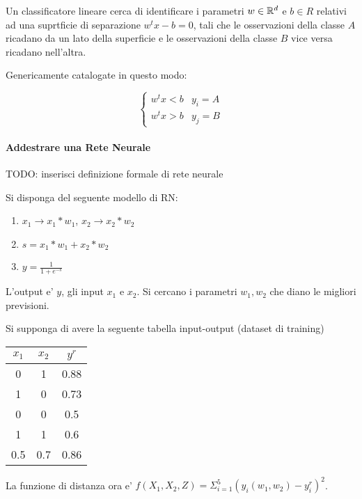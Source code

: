 Un classificatore lineare cerca di identificare  i parametri $w \in \mathbb{R}^d$ e $b \in R$ relativi ad una suprtficie di separazione $w^tx - b = 0$, tali che le osservazioni della classe $A$ ricadano da un lato della superficie e le osservazioni della classe $B$ vice versa ricadano nell'altra.

Genericamente catalogate in questo modo:

\[
    \begin{cases}
        w^tx < b & y_i = A \\
        w^tx > b & y_j = B
    \end{cases}
\]

\paragraph{Addestrare una Rete Neurale}

TODO: inserisci definizione formale di rete neurale

Si disponga del seguente modello di RN:

\begin{enumerate}
    \item $x_1 \rightarrow x_1 * w_1$, $x_2 \rightarrow x_2 * w_2$
    \item $s = x_1 * w_1 + x_2 * w_2$
    \item $y = \frac 1 {1 + e ^ {-s}}$
\end{enumerate}

L'output e' $y$, gli input $x_1$ e $x_2$.
Si cercano i parametri $w_1,w_2$ che diano le migliori previsioni.

Si supponga di avere la seguente tabella input-output (dataset di training)

\begin{center}
    \begin{tabular}{||c | c | c||}
        \hline
        $x_1$ & $x_2$ & $y^r$ \\
        \hline
        0 & 1 & 0.88 \\
        1 & 0 & 0.73 \\
        0 & 0 & 0.5 \\
        1 & 1 & 0.6 \\
        0.5 & 0.7 & 0.86 \\
        \hline
    \end{tabular}
\end{center}

La funzione di distanza ora e' $f(X_1,X_2,Z) = \Sigma ^ 5 _ {i=1} (y_i(w_1,w_2) - y^r_i)^2$.

